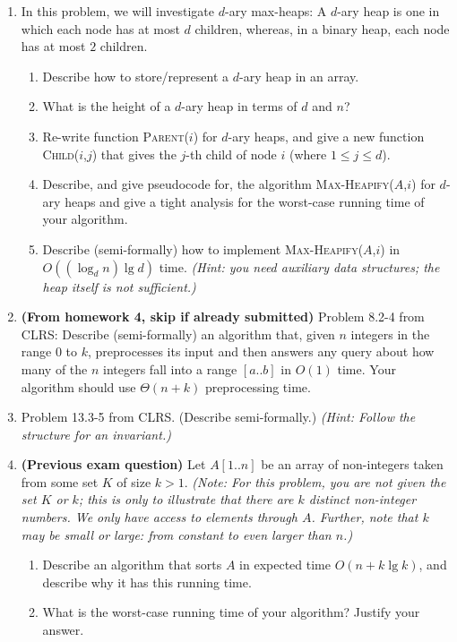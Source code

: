 \documentclass[letterpaper,11pt]{article}
\begin{document}
\begin{enumerate}

\item In this problem, we will investigate $d$-ary max-heaps: A $d$-ary heap is one in which each node has at most $d$ children, whereas, in a binary heap, each node has at most $2$ children.
\begin{enumerate}
\item Describe how to store/represent a $d$-ary heap in an array.

\item What is the height of a $d$-ary heap in terms of $d$ and $n$?

\item Re-write function \textsc{Parent}($i$) for $d$-ary heaps, and give a new function \textsc{Child}($i$,$j$) that gives the $j$-th child of node $i$ (where $1\leq j \leq d$).

\item Describe, and give pseudocode for, the algorithm \textsc{Max-Heapify}($A$,$i$) for $d$-ary heaps and give a tight analysis for the worst-case running time of your algorithm.


\item Describe (semi-formally) how to implement \textsc{Max-Heapify}($A$,$i$) in $O((\log_dn)\lg d)$ time. \emph{(Hint: you need auxiliary data structures; the heap itself is not sufficient.)}
\end{enumerate}


\item \textbf{(From homework 4, skip if already submitted)} Problem 8.2-4 from CLRS: Describe (semi-formally) an algorithm that, given $n$ integers in the range $0$ to $k$, preprocesses its input and then answers any query about how many of the $n$ integers fall into a range $[a..b]$ in $O(1)$ time. Your algorithm should use $\Theta(n + k)$ preprocessing time.

\item Problem 13.3-5 from CLRS. (Describe semi-formally.) \emph{(Hint: Follow the structure for an invariant.)}

\item \textbf{(Previous exam question)} Let $A[1..n]$ be an array of non-integers taken from some set $K$ of size $k>1$. \emph{(Note: For this problem, you are not given the set $K$ or $k$; this is only to illustrate that there are $k$ distinct non-integer numbers. We only have access to elements through $A$. Further, note that $k$ may be small or large: from constant to even larger than $n$.)}
\begin{enumerate}
\item Describe an algorithm that sorts $A$ in expected time $O(n + k\lg k)$, and describe why it has this running time. 

\item What is the worst-case running time of your algorithm? Justify your answer.
\end{enumerate}

\end{enumerate}
\end{document}
